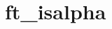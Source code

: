 \chapter{ft\+\_\+isalpha}
\hypertarget{md_Documentation_2ft__isalpha}{}\label{md_Documentation_2ft__isalpha}
